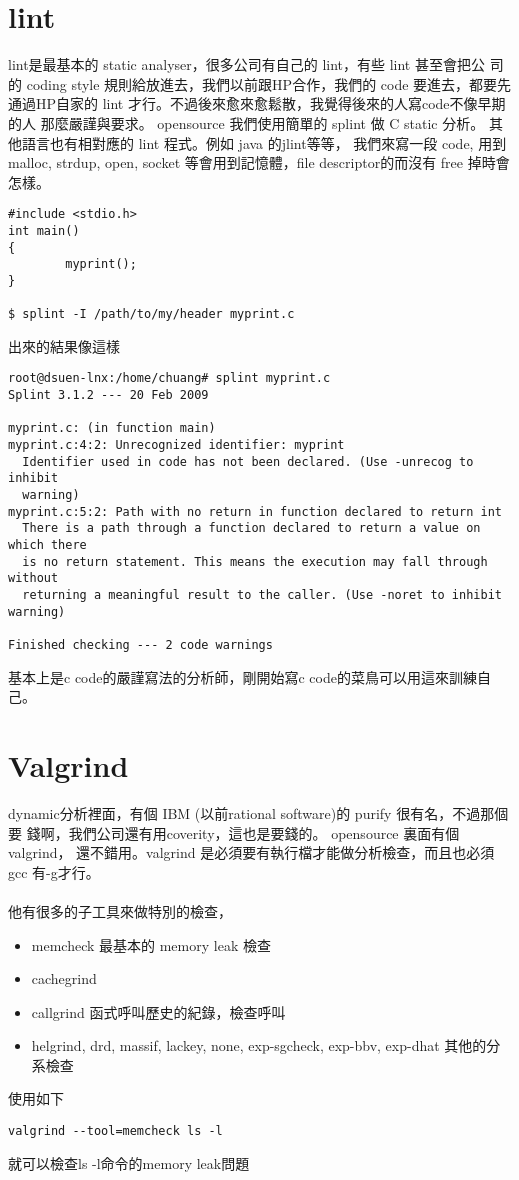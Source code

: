   \section{lint}
  lint是最基本的 static analyser，很多公司有自己的 lint，有些 lint 甚至會把公
  司的 coding style 規則給放進去，我們以前跟HP合作，我們的 code 要進去，都要先
  通過HP自家的 lint 才行。不過後來愈來愈鬆散，我覺得後來的人寫code不像早期的人
  那麼嚴謹與要求。 opensource 我們使用簡單的 splint 做 C static 分析。
  其他語言也有相對應的 lint 程式。例如 java 的jlint等等，
  我們來寫一段 code, 用到 malloc, strdup, open, socket 等會用到記憶體，file
  descriptor的而沒有 free 掉時會怎樣。
  \begin{verbatim}
#include <stdio.h>
int main()
{
        myprint();
}

$ splint -I /path/to/my/header myprint.c
  \end{verbatim}
  出來的結果像這樣
  {\scriptsize
  \begin{verbatim}
root@dsuen-lnx:/home/chuang# splint myprint.c 
Splint 3.1.2 --- 20 Feb 2009

myprint.c: (in function main)
myprint.c:4:2: Unrecognized identifier: myprint
  Identifier used in code has not been declared. (Use -unrecog to inhibit
  warning)
myprint.c:5:2: Path with no return in function declared to return int
  There is a path through a function declared to return a value on which there
  is no return statement. This means the execution may fall through without
  returning a meaningful result to the caller. (Use -noret to inhibit warning)

Finished checking --- 2 code warnings
  \end{verbatim}}
  基本上是c code的嚴謹寫法的分析師，剛開始寫c code的菜鳥可以用這來訓練自己。

  \section{Valgrind}
  dynamic分析裡面，有個 IBM (以前rational software)的 purify 很有名，不過那個要
  錢啊，我們公司還有用coverity，這也是要錢的。 opensource 裏面有個valgrind，
  還不錯用。valgrind 是必須要有執行檔才能做分析檢查，而且也必須gcc 有-g才行。
  \\\\
  他有很多的子工具來做特別的檢查，
  \begin{itemize}
    \item memcheck 最基本的 memory leak 檢查
    \item cachegrind 
    \item callgrind 函式呼叫歷史的紀錄，檢查呼叫
    \item helgrind, drd, massif, lackey, none, exp-sgcheck, exp-bbv, exp-dhat
      其他的分系檢查
  \end{itemize}
  使用如下
  \begin{verbatim}
valgrind --tool=memcheck ls -l
  \end{verbatim}
  就可以檢查ls -l命令的memory leak問題
